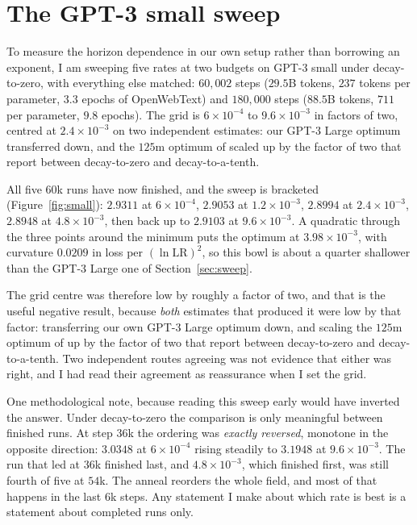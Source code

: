 \documentclass[mlabstract,onecolumn]{jmlr}
\begin{document}
\section{The GPT-3 small sweep}
\label{sec:small}

To measure the horizon dependence in our own setup rather than borrowing an exponent, I am
sweeping five rates at two budgets on GPT-3 small under decay-to-zero, with everything
else matched: $60{,}002$ steps ($29.5$B tokens, $237$ tokens per parameter, $3.3$ epochs of
OpenWebText) and $180{,}000$ steps ($88.5$B tokens, $711$ per parameter, $9.8$ epochs). The
grid is $6\times10^{-4}$ to $9.6\times10^{-3}$ in factors of two, centred at
$2.4\times10^{-3}$ on two independent estimates: our GPT-3 Large optimum transferred down,
and the $125$m optimum of \citet{bjorck2024horizons} scaled up by the factor of two that
\citet{bergsma2025d2z} report between decay-to-zero and decay-to-a-tenth.

All five $60$k runs have now finished, and the sweep is bracketed
(Figure~\ref{fig:small}): $2.9311$ at $6\times10^{-4}$, $2.9053$ at $1.2\times10^{-3}$,
$2.8994$ at $2.4\times10^{-3}$, $2.8948$ at $4.8\times10^{-3}$, then back up to $2.9103$ at
$9.6\times10^{-3}$. A quadratic through the three points around the minimum puts the optimum
at $3.98\times10^{-3}$, with curvature $0.0209$ in loss per $(\ln \mathrm{LR})^2$, so this
bowl is about a quarter shallower than the GPT-3 Large one of Section~\ref{sec:sweep}.

The grid centre was therefore low by roughly a factor of two, and that is the useful
negative result, because \emph{both} estimates that produced it were low by that factor:
transferring our own GPT-3 Large optimum down, and scaling the $125$m optimum of
\citet{bjorck2024horizons} up by the factor of two that \citet{bergsma2025d2z} report
between decay-to-zero and decay-to-a-tenth. Two independent routes agreeing was not evidence
that either was right, and I had read their agreement as reassurance when I set the grid.

One methodological note, because reading this sweep early would have inverted the answer.
Under decay-to-zero the comparison is only meaningful between finished runs. At step $36$k
the ordering was \emph{exactly reversed}, monotone in the opposite direction: $3.0348$ at
$6\times10^{-4}$ rising steadily to $3.1948$ at $9.6\times10^{-3}$. The run that led at $36$k
finished last, and $4.8\times10^{-3}$, which finished first, was still fourth of five at
$54$k. The anneal reorders the whole field, and most of that happens in the last $6$k steps.
Any statement I make about which rate is best is a statement about completed runs only.
\end{document}
